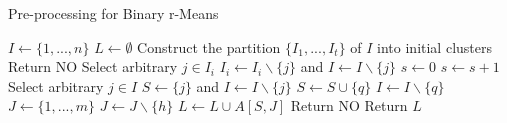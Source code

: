 \begin{algorithm}[H]
    \caption{Pre-processing for Binary r-Means}
    \label{alg:kernel}
    \begin{algorithmic}[1]
            \State $I \gets \{1,...,n\}$
            \State $L \gets \emptyset$
            \State Construct the partition $\{I_1,...,I_t\}$ of $I$ into initial clusters
                \State Return NO
            \Else
                        \State Select arbitrary $j \in I_i$
                        \State $I_i \gets I_i \backslash \{j\}$ and $I \gets I \backslash \{j\}$
                    \EndWhile
                \EndFor
                \State $s \gets 0$
                    \State $s \gets s+1$
                    \State Select arbitrary $j \in I$
                    \State $S \gets \{j\}$ and $I \gets I \backslash \{j\}$
                        \State $S \gets S \cup \{q\}$
                        \State $I \gets I \backslash \{q\}$
                    \EndWhile
                    \State $J \gets \{1,...,m\}$
                        \State $J \gets J \backslash \{h\}$
                    \EndWhile
                    \State $L \gets L \cup A[S,J]$
                \EndWhile
            \EndIf
                \State Return NO
            \Else
                \State Return $L$
            \EndIf
        \EndProcedure
    \end{algorithmic}
\end{algorithm}